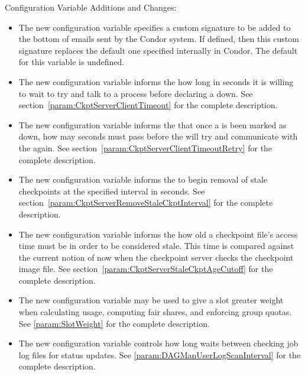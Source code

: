 \noindent Configuration Variable Additions and Changes:

\begin{itemize}

\item The new configuration variable  specifies
a custom signature to be added to the bottom of emails sent by the
Condor system.  If defined, then this custom signature replaces the
default one specified internally in Condor. The default for this variable
is undefined.

\item The new configuration variable 
informs the  how long in seconds it is willing to wait
to try and talk to a  process before declaring a
 down.
See section~\ref{param:CkptServerClientTimeout} for the complete description.

\item The new configuration variable
 informs the 
that once a  is been marked as down, how may seconds
must pass before the  will try and communicate with the
 again.
See section~\ref{param:CkptServerClientTimeoutRetry} 
for the complete description.

\item The new configuration variable
 informs the
 to begin removal of stale checkpoints at the specified
interval in seconds.
See section~\ref{param:CkptServerRemoveStaleCkptInterval} 
for the complete description.

\item The new configuration variable
 informs the
 how old a checkpoint file's access time must be
in order to be considered stale. This time is compared against the
current notion of now
when the checkpoint server checks the checkpoint image file.
See section~\ref{param:CkptServerStaleCkptAgeCutoff} 
for the complete description.

\item The new configuration variable  may be used to
give a slot greater weight when calculating usage, computing fair
shares, and enforcing group quotas.  
See \ref{param:SlotWeight} for the complete description.

\item The new configuration variable 
controls how long  waits between checking job log files
for status updates.
See \ref{param:DAGManUserLogScanInterval} for the complete description.


\end{itemize}
